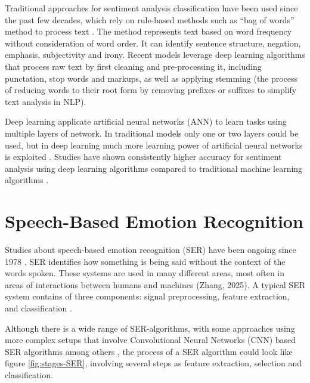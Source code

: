 Traditional approaches for sentiment analysis classification have been used since the past few decades, which rely on rule-based methods such as “bag of words” method to process text  \autocite{Kansara2020}. The method represents text based on word frequency without consideration of word order. It can identify sentence structure, negation, emphasis, subjectivity and irony. Recent models leverage deep learning algorithms that process raw text by first cleaning and pre-processing it, including punctation, stop words and markups, as well as applying stemming (the process of reducing words to their root form by removing prefixes or suffixes to simplify text analysis in NLP). 

Deep learning applicate artificial neural networks (ANN) to learn tasks using multiple layers of network. In traditional models only one or two layers could be used, but in deep learning much more learning power of artificial neural networks is exploited \autocite{Zhang2018}. Studies have shown consistently higher accuracy for sentiment analysis using deep learning algorithms compared to traditional machine learning algorithms \autocite{Kansara2020}.
 

\section{Speech-Based Emotion Recognition}

Studies about speech-based emotion recognition (SER) have been ongoing since 1978 \autocite{LGENSNMEZ2024}. SER identifies how something is being said without the context of the words spoken. These systems are used in many different areas, most often in areas of interactions between humans and machines (Zhang, 2025). 
A typical SER system contains of three components: signal preprocessing, feature extraction, and classification \autocite{Sahoo2023}.

Although there is a wide range of SER-algorithms, with some approaches using more complex setups that involve Convolutional Neural Networks (CNN) based SER algorithms among others \autocite{Ri2023}, the process of a SER algorithm could look like figure \ref{fig:stages-SER}, involving several steps as feature extraction, selection and classification.


